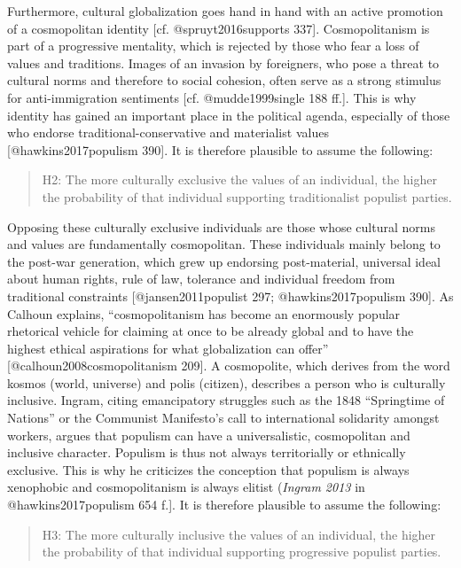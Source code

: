 \documentclass[]{article}
\begin{document}
Furthermore, cultural globalization goes hand in hand with an active
promotion of a cosmopolitan identity {[}cf. @spruyt2016supports 337{]}.
Cosmopolitanism is part of a progressive mentality, which is rejected by
those who fear a loss of values and traditions. Images of an invasion by
foreigners, who pose a threat to cultural norms and therefore to social
cohesion, often serve as a strong stimulus for anti-immigration
sentiments {[}cf. @mudde1999single 188 ff.{]}. This is why identity has
gained an important place in the political agenda, especially of those
who endorse traditional-conservative and materialist values
{[}@hawkins2017populism 390{]}. It is therefore plausible to assume the
following:

\begin{quote}
H2: The more culturally exclusive the values of an individual, the
higher the probability of that individual supporting traditionalist
populist parties.
\end{quote}

Opposing these culturally exclusive individuals are those whose cultural
norms and values are fundamentally cosmopolitan. These individuals
mainly belong to the post-war generation, which grew up endorsing
post-material, universal ideal about human rights, rule of law,
tolerance and individual freedom from traditional constraints
{[}@jansen2011populist 297; @hawkins2017populism 390{]}. As Calhoun
explains, ``cosmopolitanism has become an enormously popular rhetorical
vehicle for claiming at once to be already global and to have the
highest ethical aspirations for what globalization can offer''
{[}@calhoun2008cosmopolitanism 209{]}. A cosmopolite, which derives from
the word kosmos (world, universe) and polis (citizen), describes a
person who is culturally inclusive. Ingram, citing emancipatory
struggles such as the 1848 ``Springtime of Nations'' or the Communist
Manifesto's call to international solidarity amongst workers, argues
that populism can have a universalistic, cosmopolitan and inclusive
character. Populism is thus not always territorially or ethnically
exclusive. This is why he criticizes the conception that populism is
always xenophobic and cosmopolitanism is always elitist (\emph{Ingram
2013} in @hawkins2017populism 654 f.{]}. It is therefore plausible to
assume the following:

\begin{quote}
H3: The more culturally inclusive the values of an individual, the
higher the probability of that individual supporting progressive
populist parties.
\end{quote}
\end{document}
